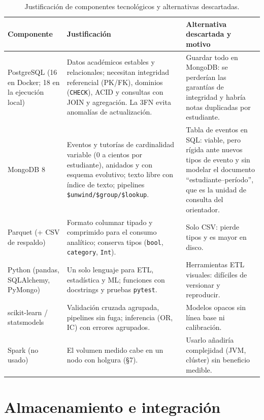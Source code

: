 \documentclass[11pt,a4paper]{article}
\newcommand{\fuente}[1]{\par\vspace{2pt}{\footnotesize\textit{Fuente:} #1}}
\begin{document}
\begin{table}[H]
\centering\scriptsize
\caption{Justificación de componentes tecnológicos y alternativas descartadas.}\label{tab:componentes}
\begin{tabular}{p{2.4cm}p{6.2cm}p{5.8cm}}
\toprule
Componente & Justificación & Alternativa descartada y motivo \\
\midrule
PostgreSQL (16 en Docker; 18 en la ejecución local) & Datos académicos estables y relacionales; necesitan integridad referencial (PK/FK), dominios (\texttt{CHECK}), ACID y consultas con JOIN y agregación. La 3FN evita anomalías de actualización. & Guardar todo en MongoDB: se perderían las garantías de integridad y habría notas duplicadas por estudiante. \\
MongoDB 8 & Eventos y tutorías de cardinalidad variable (0 a cientos por estudiante), anidados y con esquema evolutivo; texto libre con índice de texto; pipelines \texttt{\$unwind/\$group/\$lookup}. & Tabla de eventos en SQL: viable, pero rígida ante nuevos tipos de evento y sin modelar el documento “estudiante–período”, que es la unidad de consulta del orientador. \\
Parquet (+ CSV de respaldo) & Formato columnar tipado y comprimido para el consumo analítico; conserva tipos (\texttt{bool}, \texttt{category}, \texttt{Int}). & Solo CSV: pierde tipos y es mayor en disco. \\
Python (pandas, SQLAlchemy, PyMongo) & Un solo lenguaje para ETL, estadística y ML; funciones con docstrings y pruebas \texttt{pytest}. & Herramientas ETL visuales: difíciles de versionar y reproducir. \\
scikit-learn / statsmodels & Validación cruzada agrupada, pipelines sin fuga; inferencia (OR, IC) con errores agrupados. & Modelos opacos sin línea base ni calibración. \\
Spark (no usado) & El volumen medido cabe en un nodo con holgura (§7). & Usarlo añadiría complejidad (JVM, clúster) sin beneficio medible. \\
\bottomrule
\end{tabular}
\fuente{elaboración propia.}
\end{table}

\section{Almacenamiento e integración}
\end{document}
